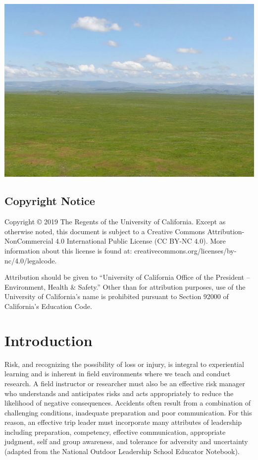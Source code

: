 \documentclass[
]{book}
\begin{document}
\begin{center}\includegraphics[width=0.75\linewidth]{images/background1} \end{center}

\hypertarget{copyright-notice}{%
\section*{Copyright Notice}\label{copyright-notice}}

Copyright © 2019 The Regents of the University of California. Except as otherwise noted, this document is subject to a Creative Commons Attribution-NonCommercial 4.0 International Public License (CC BY-NC 4.0). More information about this license is found at: creativecommons.org/licenses/by-nc/4.0/legalcode.

Attribution should be given to ``University of California Office of the President -- Environment, Health \& Safety.'' Other than for attribution purposes, use of the University of California's name is prohibited pursuant to Section 92000 of California's Education Code.

\hypertarget{introduction}{%
\chapter*{Introduction}\label{introduction}}

Risk, and recognizing the possibility of loss or injury, is integral to experiential learning and is inherent in field environments where we teach and conduct research. A field instructor or researcher must also be an effective risk manager who understands and anticipates risks and acts appropriately to reduce the likelihood of negative consequences. Accidents often result from a combination of challenging conditions, inadequate preparation and poor communication. For this reason, an effective trip leader must incorporate many attributes of leadership including preparation, competency, effective communication, appropriate judgment, self and group awareness, and tolerance for adversity and uncertainty (adapted from the National Outdoor Leadership School Educator Notebook).
\end{document}
